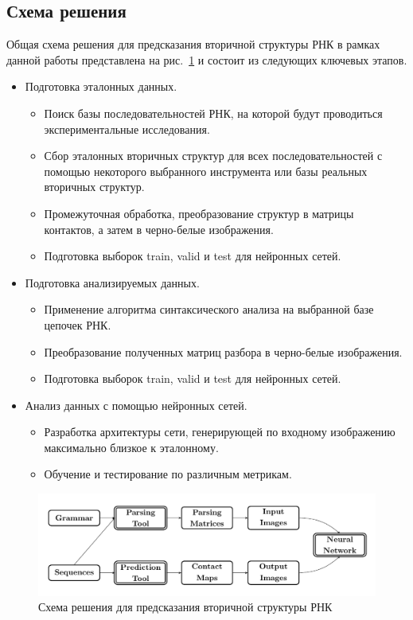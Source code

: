 \documentclass[14pt]{matmex-diploma-custom}
\begin{document}
\subsection{Схема решения}
Общая схема решения для предсказания вторичной структуры РНК в рамках данной работы представлена на рис.~\ref{schema} и состоит из следующих ключевых этапов.
\begin{itemize}
    \item Подготовка эталонных данных.
    \begin{itemize}
        \item Поиск базы последовательностей РНК, на которой будут проводиться экспериментальные исследования.
        \item Сбор эталонных вторичных структур для всех последовательностей с помощью некоторого выбранного инструмента или базы реальных вторичных структур.
        \item Промежуточная обработка, преобразование структур в матрицы контактов, а затем в черно-белые изображения.
        \item Подготовка выборок train, valid и test для нейронных сетей.
    \end{itemize}
    \item Подготовка анализируемых данных.
    \begin{itemize}
        \item Применение алгоритма синтаксического анализа на выбранной базе цепочек РНК.
        \item Преобразование полученных матриц разбора в черно-белые изображения.
        \item Подготовка выборок train, valid и test для нейронных сетей.
    \end{itemize}
    \item Анализ данных с помощью нейронных сетей.
    \begin{itemize}
        \item Разработка архитектуры сети, генерирующей по входному изображению максимально близкое к эталонному.
        \item Обучение и тестирование по различным метрикам.
    \end{itemize}
\end{itemize}

\begin{figure}[h]
\begin{center}
\centering
\includegraphics[width=16cm]{pics/schema.pdf}
\caption{Схема решения для предсказания вторичной структуры РНК}
\label{schema}
\end{center}
\end{figure} 
\end{document}
